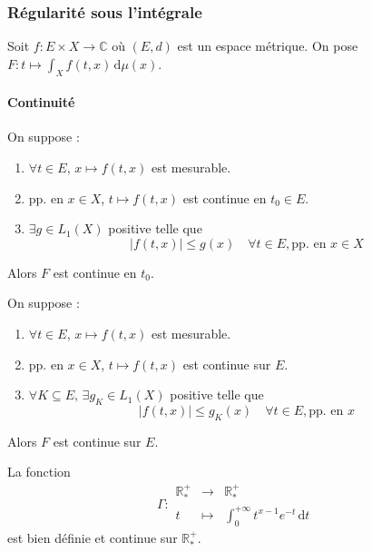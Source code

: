   \subsubsection{Régularité sous l'intégrale}


  Soit $f : E \times X \rightarrow \mathbb{C}$ où $(E, d)$ est un espace métrique. On pose $F : t \mapsto \int_X f(t, x) \, \mathrm{d}\mu(x)$.

  \paragraph{Continuité}

  \begin{theorem}
    On suppose :
    \begin{enumerate}[label=(\roman*)]
      \item $\forall t \in E$, $x \mapsto f(t,x)$ est mesurable.
      \item pp. en $x \in X$, $t \mapsto f(t,x)$ est continue en $t_0 \in E$.
      \item $\exists g \in L_1(X)$ positive telle que
      \[ |f(t,x)| \leq g(x) \quad \forall t \in E, \text{pp. en } x \in X \]
    \end{enumerate}
    Alors $F$ est continue en $t_0$.
  \end{theorem}

  \begin{corollary}
    On suppose :
    \begin{enumerate}[label=(\roman*)]
      \item $\forall t \in E$, $x \mapsto f(t,x)$ est mesurable.
      \item pp. en $x \in X$, $t \mapsto f(t,x)$ est continue sur $E$.
      \item $\forall K \subseteq E, \, \exists g_K \in L_1(X)$ positive telle que
      \[ |f(t,x)| \leq g_K(x) \quad \forall t \in E, \text{pp. en } x \]
    \end{enumerate}
    Alors $F$ est continue sur $E$.
  \end{corollary}


  \begin{example}
    \label{234-3}
    La fonction
    \[ \Gamma :
    \begin{array}{ccc}
      \mathbb{R}^+_* &\rightarrow& \mathbb{R}^+_* \\
      t &\mapsto& \int_{0}^{+\infty} t^{x-1} e^{-t} \, \mathrm{d}t
    \end{array}
    \]
    est bien définie et continue sur $\mathbb{R}^+_*$.
  \end{example}

